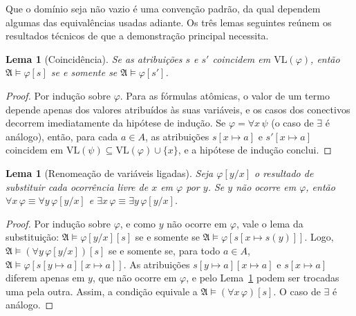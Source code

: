 \documentclass[12pt,a4paper,oneside]{report}
\theoremstyle{tituloplain}
\newtheorem{lema}[teorema]{Lema}
\theoremstyle{titulodef}
\begin{document}
Que o domínio seja não vazio é uma convenção padrão, da qual dependem algumas das equivalências usadas adiante. Os três lemas seguintes reúnem os resultados técnicos de que a demonstração principal necessita.

\begin{lema}[Coincidência]\label{lem:coincidencia}
Se as atribuições $s$ e $s'$ coincidem em $\mathrm{VL}(\varphi)$, então $\mathfrak{A}\models\varphi[s]$ se e somente se $\mathfrak{A}\models\varphi[s']$.
\end{lema}
\begin{proof}
Por indução sobre $\varphi$. Para as fórmulas atômicas, o valor de um termo depende apenas dos valores atribuídos às suas variáveis, e os casos dos conectivos decorrem imediatamente da hipótese de indução. Se $\varphi=\forall x\,\psi$ (o caso de $\exists$ é análogo), então, para cada $a\in A$, as atribuições $s[x\mapsto a]$ e $s'[x\mapsto a]$ coincidem em $\mathrm{VL}(\psi)\subseteq\mathrm{VL}(\varphi)\cup\{x\}$, e a hipótese de indução conclui.
\end{proof}

\begin{lema}[Renomeação de variáveis ligadas]\label{lem:renomeacao}
Seja $\varphi[y/x]$ o resultado de substituir cada ocorrência livre de $x$ em $\varphi$ por $y$. Se $y$ não ocorre em $\varphi$, então $\forall x\,\varphi\equiv\forall y\,\varphi[y/x]$ e $\exists x\,\varphi\equiv\exists y\,\varphi[y/x]$.
\end{lema}
\begin{proof}
Por indução sobre $\varphi$, e como $y$ não ocorre em $\varphi$, vale o lema da substituição: $\mathfrak{A}\models\varphi[y/x][s]$ se e somente se $\mathfrak{A}\models\varphi[s[x\mapsto s(y)]]$. Logo, $\mathfrak{A}\models(\forall y\,\varphi[y/x])[s]$ se e somente se, para todo $a\in A$, $\mathfrak{A}\models\varphi[s[y\mapsto a][x\mapsto a]]$. As atribuições $s[y\mapsto a][x\mapsto a]$ e $s[x\mapsto a]$ diferem apenas em $y$, que não ocorre em $\varphi$, e pelo Lema~\ref{lem:coincidencia} podem ser trocadas uma pela outra. Assim, a condição equivale a $\mathfrak{A}\models(\forall x\,\varphi)[s]$. O caso de $\exists$ é análogo.
\end{proof}
\end{document}
